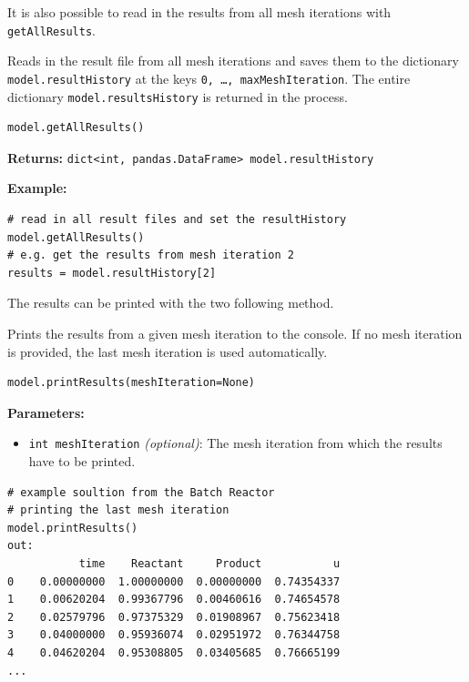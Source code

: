 \documentclass[12pt]{article}
\begin{document}
It is also possible to read in the results from all mesh iterations with \texttt{getAllResults}.

\begin{mdframed}[backgroundcolor=gray!10, roundcorner=10pt,
		linewidth=1pt]
	
	Reads in the result file from all mesh iterations and saves them to the dictionary \texttt{model.resultHistory} at the keys \texttt{0, \ldots, maxMeshIteration}. The entire dictionary \texttt{model.resultsHistory} is returned in the process.
 
	\begin{lstlisting}
model.getAllResults()
		\end{lstlisting}
	\label{getAllResults}
	
	\textbf{Returns:} \texttt{dict<int, pandas.DataFrame> model.resultHistory}
	
	\textbf{Example:} \begin{lstlisting}
# read in all result files and set the resultHistory
model.getAllResults()
# e.g. get the results from mesh iteration 2
results = model.resultHistory[2]  
	\end{lstlisting}

\end{mdframed}

The results can be printed with the two following method.

\begin{mdframed}[backgroundcolor=gray!10, roundcorner=10pt,
		linewidth=1pt]
	
	Prints the results from a given mesh iteration to the console. If no mesh iteration is provided, the last mesh iteration is used automatically.
 
	\begin{lstlisting}
model.printResults(meshIteration=None)
		\end{lstlisting}
	\label{printResults}
	\textbf{Parameters:}
	\begin{itemize}
		\item \texttt{int meshIteration} \emph{(optional)}: The mesh iteration from which the results have to be printed. 
	\end{itemize}
\begin{lstlisting}
# example soultion from the Batch Reactor
# printing the last mesh iteration
model.printResults()
out:
           time    Reactant     Product           u
0    0.00000000  1.00000000  0.00000000  0.74354337
1    0.00620204  0.99367796  0.00460616  0.74654578
2    0.02579796  0.97375329  0.01908967  0.75623418
3    0.04000000  0.95936074  0.02951972  0.76344758
4    0.04620204  0.95308805  0.03405685  0.76665199
...
\end{lstlisting}
\end{mdframed}
\end{document}
